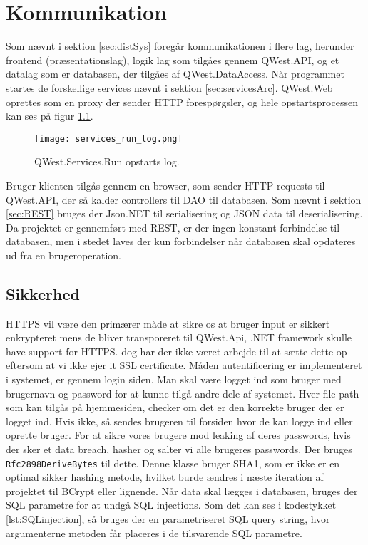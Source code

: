\chapter{Kommunikation}\label{ch:communication}
Som nævnt i sektion \ref{sec:distSys} foregår kommunikationen i flere lag, herunder frontend (præsentationslag), logik lag som tilgåes gennem QWest.API, og et datalag som er databasen, der tilgåes af QWest.DataAccess. 
Når programmet startes de forskellige services nævnt i sektion \ref{sec:servicesArc}. QWest.Web oprettes som en proxy der sender HTTP forespørgsler, og hele opstartsprocessen kan ses på figur \ref{fig:startup_log}.

\begin{figure}
    \texttt{[image: services\_run\_log.png]}
    \caption{QWest.Services.Run opstarts log.}
    \label{fig:startup_log}
\end{figure}

Bruger-klienten tilgås gennem en browser, som sender HTTP-requests til QWest.API, der så kalder controllers til DAO til databasen. Som nævnt i sektion \ref{sec:REST} bruges der Json.NET til serialisering og JSON data til deserialisering. Da projektet er gennemført med REST, er der ingen konstant forbindelse til databasen, men i stedet laves der kun forbindelser når databasen skal opdateres ud fra en brugeroperation. 

\section{Sikkerhed}\label{sec:security}
HTTPS vil være den primærer måde at sikre os at bruger input er sikkert enkrypteret mens de bliver transporeret til QWest.Api, .NET framework skulle have support for HTTPS. \cite{DotNetFrameworkSSL} dog har der ikke været arbejde til at sætte dette op eftersom at vi ikke ejer it SSL certificate.
Måden autentificering er implementeret i systemet, er gennem login siden. Man skal være logget ind som bruger med brugernavn og password for at kunne tilgå andre dele af systemet. Hver file-path som kan tilgås på hjemmesiden, checker om det er den korrekte bruger der er logget ind. Hvis ikke, så sendes brugeren til forsiden hvor de kan logge ind eller oprette bruger.
For at sikre vores brugere mod leaking af deres passwords, hvis der sker et data breach, hasher og salter vi alle brugeres passwords. Der bruges \texttt{Rfc2898DeriveBytes} \cite{Rfc2898DeriveBytes} til dette. Denne klasse bruger SHA1, som er ikke er en optimal sikker hashing metode, hvilket burde ændres i næste iteration af projektet \cite{HowsecureisSHA1} til BCrypt \cite{BCrypt} eller lignende.
Når data skal lægges i databasen, bruges der SQL parametre for at undgå SQL injections. Som det kan ses i kodestykket \ref{lst:SQLinjection}, så bruges der en parametriseret SQL query string, hvor argumenterne metoden får placeres i de tilsvarende SQL parametre.

